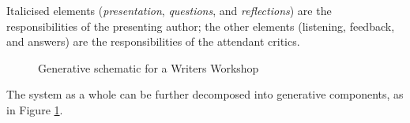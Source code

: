 
Italicised elements (\emph{presentation}, \emph{questions}, and
\emph{reflections}) are the responsibilities of the presenting author; the other
elements (listening, feedback, and answers) are the responsibilities of the attendant critics.
%
\begin{figure}
{\centering


\par}
\caption{Generative schematic for a Writers Workshop\label{fig:generative-diagram}}
\end{figure}
%
The system as a whole can be further decomposed into generative
components, as in Figure \ref{fig:generative-diagram}.
